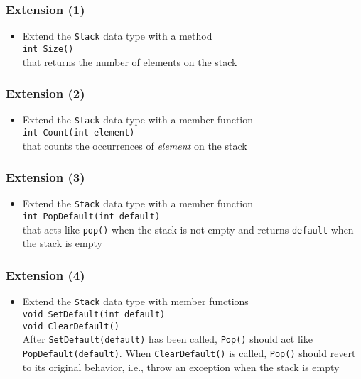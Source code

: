 \documentclass[10pt,aspectratio=169]{beamer}
\begin{document}
\begin{frame}[fragile]
  \frametitle{Extension (1)}  
  \begin{itemize}
  \item Extend the \texttt{Stack} data type with a method\\[1ex]
    \texttt{int Size()}\\[1ex]
    that returns the number of elements on the stack
  \end{itemize}
\end{frame}

\begin{frame}[fragile]
  \frametitle{Extension (2)}  
  \begin{itemize}
  \item Extend the \texttt{Stack} data type with a member function\\[1ex]
    \texttt{int Count(int element)}\\[1ex]
    that counts the occurrences of \emph{element} on the stack
  \end{itemize}
\end{frame}

\begin{frame}[fragile]
  \frametitle{Extension (3)}  
  \begin{itemize}
  \item Extend the \texttt{Stack} data type with a member function\\[1ex]
    \texttt{int PopDefault(int default)}\\[1ex]
    that acts like \texttt{pop()} when the stack is not empty and
    returns \texttt{default} when the stack is empty
  \end{itemize}
\end{frame}

\begin{frame}[fragile]
  \frametitle{Extension (4)}  
  \begin{itemize}
  \item Extend the \texttt{Stack} data type with member functions\\[1ex]
    \texttt{void SetDefault(int default)}\\
    \texttt{void ClearDefault()}\\[1ex]
    After \texttt{SetDefault(default)} has been called, \texttt{Pop()}
    should act like \texttt{PopDefault(default)}. When
    \texttt{ClearDefault()} is called, \texttt{Pop()} should revert to
    its original behavior, i.e., throw an exception when the stack is
    empty
  \end{itemize}
\end{frame}
\end{document}
